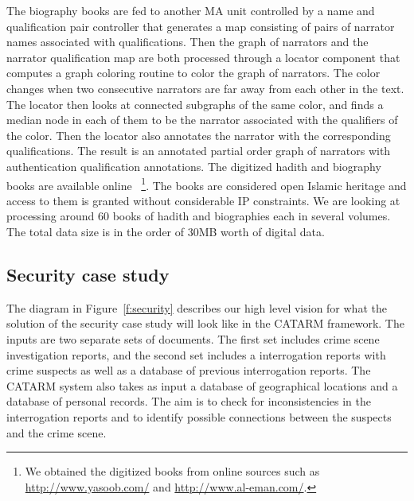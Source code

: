 \documentclass[12pt]{article}
\begin{document}
The biography books are fed to another MA unit controlled by 
a name and qualification pair controller that generates a 
map consisting of pairs of narrator names associated with 
qualifications. 
Then the graph of narrators and the narrator qualification map
are both processed through a locator component that computes
a graph coloring routine to color the graph of narrators. 
The color changes when two consecutive narrators are far away
from each other in the text. 
The locator then looks at connected subgraphs of the same color,
and finds a median node in each of them to be the narrator 
associated with the qualifiers of the color. 
Then the locator also annotates the narrator with the 
corresponding qualifications. 
The result is an annotated partial order graph of narrators
with authentication qualification annotations. 
The digitized hadith and biography books are available 
online~ \footnote{We obtained
  the digitized books from online sources such as 
  \href{http://www.yasoob.com/}{http://www.yasoob.com/} and 
  \href{http://www.al-eman.com/}{http://www.al-eman.com/}. }.
The books are considered open Islamic heritage and access to
them is granted without considerable IP constraints. 
We are looking at processing around 60 books of hadith and
biographies each in several volumes. 
The total data size is in the order of 30MB worth of digital 
data.

\subsection{Security case study}
\label{s:design:sec}

\begin{figure}
\end{figure}


The diagram in Figure~\ref{f:security} describes our 
high level vision for what the solution of the 
security case study
will look like in the CATARM framework. 
The inputs are two separate sets of documents. 
The first set includes crime scene investigation reports, 
and the second set includes a 
interrogation reports with crime suspects as well as 
a database of previous interrogation reports. 
The CATARM system also takes as input a database of geographical
locations and a database of personal records. 
The aim is to check for inconsistencies in the interrogation
reports and to identify possible connections between the suspects
and the crime scene. 
\end{document}
